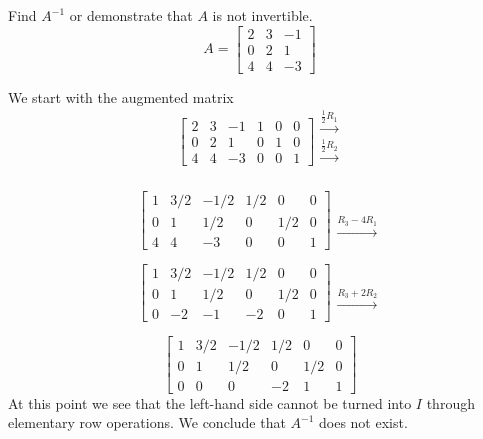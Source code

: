 \documentclass{ximera}
\begin{document}
\begin{example}Find $A^{-1}$ or demonstrate that $A$ is not invertible.
$$A=\begin{bmatrix}2&3&-1\\0&2&1\\4&4&-3\end{bmatrix}$$
\begin{explanation}
We start with the augmented matrix
$$\left[\begin{array}{ccc|ccc}  
 2&3&-1&1&0&0\\0&2&1&0&1&0\\4&4&-3&0&0&1
 \end{array}\right]
 \begin{array}{c}
 \xrightarrow{\frac{1}{2}R_1}\\
 \xrightarrow{\frac{1}{2}R_2}\\
\\
 \end{array}$$

 $$\left[\begin{array}{ccc|ccc}  
 1&3/2&-1/2&1/2&0&0\\0&1&1/2&0&1/2&0\\4&4&-3&0&0&1
 \end{array}\right]
 \begin{array}{c}
 \\
 \\
\xrightarrow{R_3-4R_1}
 \end{array}$$

 $$\left[\begin{array}{ccc|ccc}  
 1&3/2&-1/2&1/2&0&0\\0&1&1/2&0&1/2&0\\0&-2&-1&-2&0&1
 \end{array}\right]
 \begin{array}{c}
 \\
 \\
\xrightarrow{R_3+2R_2}
 \end{array}$$
 
 $$\left[\begin{array}{ccc|ccc}  
 1&3/2&-1/2&1/2&0&0\\0&1&1/2&0&1/2&0\\0&0&0&-2&1&1
 \end{array}\right]$$
 At this point we see that the left-hand side cannot be turned into $I$ through elementary row operations. We conclude that $A^{-1}$ does not exist.
\end{explanation}
\end{example}
\end{document}
